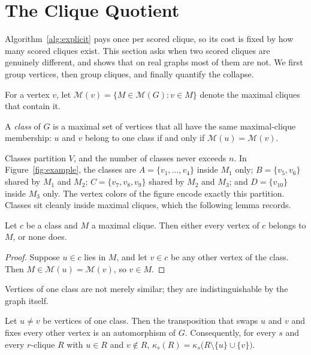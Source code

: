 \section{The Clique Quotient}\label{sec:quotient}
Algorithm~\ref{alg:explicit} pays once per scored clique, so its cost is fixed by how many scored cliques exist.
%
This section asks when two scored cliques are genuinely different, and shows that on real graphs most of them are not.
%
We first group vertices, then group cliques, and finally quantify the collapse.

For a vertex $v$, let $\mathcal{M}(v)=\{M\in\mathcal{M}(G): v\in M\}$ denote the maximal cliques that contain it.

\begin{definition}[Class]\label{def:class}
A \emph{class} of $G$ is a maximal set of vertices that all have the same maximal-clique membership: $u$ and $v$ belong to one class if and only if $\mathcal{M}(u)=\mathcal{M}(v)$.
\end{definition}

Classes partition $V$, and the number of classes never exceeds $n$.
%
In Figure~\ref{fig:example}, the classes are $A=\{v_1,\dots,v_4\}$ inside $M_1$ only; $B=\{v_5,v_6\}$ shared by $M_1$ and $M_2$; $C=\{v_7,v_8,v_9\}$ shared by $M_2$ and $M_3$; and $D=\{v_{10}\}$ inside $M_3$ only.
%
The vertex colors of the figure encode exactly this partition.
%
Classes sit cleanly inside maximal cliques, which the following lemma records.

\begin{lemma}\label{lem:containment}
Let $c$ be a class and $M$ a maximal clique.
%
Then either every vertex of $c$ belongs to $M$, or none does.
\end{lemma}

\begin{proof}
Suppose $u\in c$ lies in $M$, and let $v\in c$ be any other vertex of the class.
%
Then $M\in\mathcal{M}(u)=\mathcal{M}(v)$, so $v\in M$.
\end{proof}

Vertices of one class are not merely similar; they are indistinguishable by the graph itself.

\begin{theorem}[Interchangeability]\label{thm:interchange}
Let $u\neq v$ be vertices of one class.
%
Then the transposition that swaps $u$ and $v$ and fixes every other vertex is an automorphism of $G$.
%
Consequently, for every $s$ and every $r$-clique $R$ with $u\in R$ and $v\notin R$, $\kappa_s(R)=\kappa_s\bigl(R\setminus\{u\}\cup\{v\}\bigr)$.
\end{theorem}

